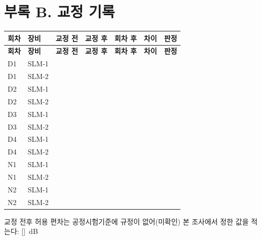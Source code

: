 \documentclass[10.5pt,a4paper]{article}
\newcommand{\IN}{[\quad]}
\newcommand{\hd}[1]{\cellcolor{headfill}\textbf{\sffamily #1}}
\newcommand{\ip}{\cellcolor{inp}}
\begin{document}
\section*{부록 B. 교정 기록}
\small
\begin{longtable}{>{\centering\arraybackslash}p{}>{\centering\arraybackslash}p{}>{\centering\arraybackslash}p{}>{\centering\arraybackslash}p{}>{\centering\arraybackslash}p{}>{\centering\arraybackslash}p{}>{\centering\arraybackslash}p{}}
\toprule
\hd{회차} & \hd{장비} & \hd{교정 전} & \hd{교정 후} & \hd{회차 후} & \hd{차이} & \hd{판정} \\ \midrule
\endfirsthead
\toprule
\hd{회차} & \hd{장비} & \hd{교정 전} & \hd{교정 후} & \hd{회차 후} & \hd{차이} & \hd{판정} \\ \midrule
\endhead
\bottomrule
\endlastfoot
D1 & SLM-1 & \ip{} & \ip{} & \ip{} & \ip{} & \ip{} \\ \midrule
D1 & SLM-2 & \ip{} & \ip{} & \ip{} & \ip{} & \ip{} \\ \midrule
D2 & SLM-1 & \ip{} & \ip{} & \ip{} & \ip{} & \ip{} \\ \midrule
D2 & SLM-2 & \ip{} & \ip{} & \ip{} & \ip{} & \ip{} \\ \midrule
D3 & SLM-1 & \ip{} & \ip{} & \ip{} & \ip{} & \ip{} \\ \midrule
D3 & SLM-2 & \ip{} & \ip{} & \ip{} & \ip{} & \ip{} \\ \midrule
D4 & SLM-1 & \ip{} & \ip{} & \ip{} & \ip{} & \ip{} \\ \midrule
D4 & SLM-2 & \ip{} & \ip{} & \ip{} & \ip{} & \ip{} \\ \midrule
N1 & SLM-1 & \ip{} & \ip{} & \ip{} & \ip{} & \ip{} \\ \midrule
N1 & SLM-2 & \ip{} & \ip{} & \ip{} & \ip{} & \ip{} \\ \midrule
N2 & SLM-1 & \ip{} & \ip{} & \ip{} & \ip{} & \ip{} \\ \midrule
N2 & SLM-2 & \ip{} & \ip{} & \ip{} & \ip{} & \ip{} \\
\end{longtable}
\addtocounter{table}{-1}
\normalsize
{\small 교정 전후 허용 편차는 공정시험기준에 규정이 없어(미확인) 본 조사에서 정한 값을 적는다: \IN\ dB\par}
\end{document}
